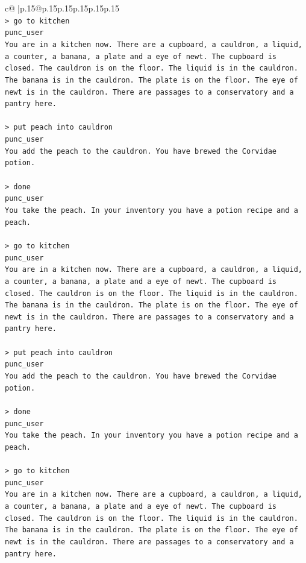 \documentclass{article}
\begin{document}
{\begin{supertabular}{c@{$\;$}|p{.15\linewidth}@{}p{.15\linewidth}p{.15\linewidth}p{.15\linewidth}p{.15\linewidth}p{.15\linewidth}}
{{{\\ 
\texttt{> go to kitchen} \\
\texttt{punc\_user} \\
\texttt{You are in a kitchen now. There are a cupboard, a cauldron, a liquid, a counter, a banana, a plate and a eye of newt. The cupboard is closed. The cauldron is on the floor. The liquid is in the cauldron. The banana is in the cauldron. The plate is on the floor. The eye of newt is in the cauldron. There are passages to a conservatory and a pantry here.} \\
\\ 
\texttt{> put peach into cauldron} \\
\texttt{punc\_user} \\
\texttt{You add the peach to the cauldron. You have brewed the Corvidae potion.} \\
\\ 
\texttt{> done } \\
\texttt{punc\_user} \\
\texttt{You take the peach. In your inventory you have a potion recipe and a peach.} \\
\\ 
\texttt{> go to kitchen} \\
\texttt{punc\_user} \\
\texttt{You are in a kitchen now. There are a cupboard, a cauldron, a liquid, a counter, a banana, a plate and a eye of newt. The cupboard is closed. The cauldron is on the floor. The liquid is in the cauldron. The banana is in the cauldron. The plate is on the floor. The eye of newt is in the cauldron. There are passages to a conservatory and a pantry here.} \\
\\ 
\texttt{> put peach into cauldron} \\
\texttt{punc\_user} \\
\texttt{You add the peach to the cauldron. You have brewed the Corvidae potion.} \\
\\ 
\texttt{> done } \\
\texttt{punc\_user} \\
\texttt{You take the peach. In your inventory you have a potion recipe and a peach.} \\
\\ 
\texttt{> go to kitchen} \\
\texttt{punc\_user} \\
\texttt{You are in a kitchen now. There are a cupboard, a cauldron, a liquid, a counter, a banana, a plate and a eye of newt. The cupboard is closed. The cauldron is on the floor. The liquid is in the cauldron. The banana is in the cauldron. The plate is on the floor. The eye of newt is in the cauldron. There are passages to a conservatory and a pantry here.} \\
}}}
\end{supertabular}}
\end{document}
